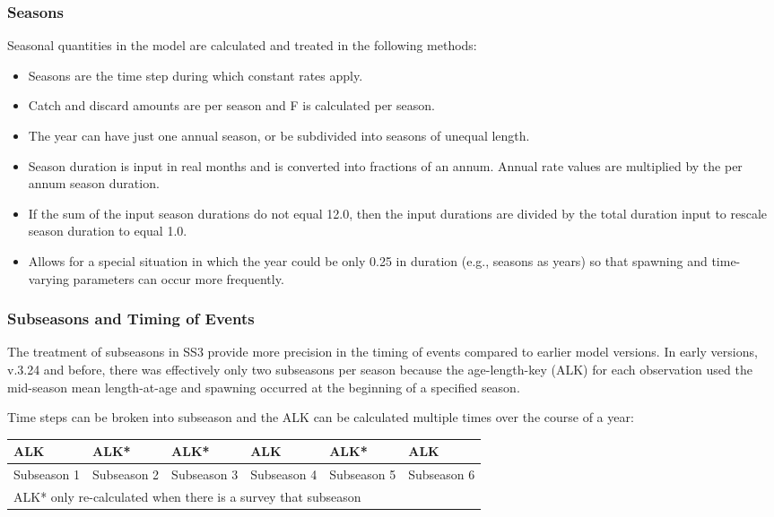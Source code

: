 \subsubsection{Seasons}
Seasonal quantities in the model are calculated and treated in the following methods:
	 \begin{itemize}
	 	\item Seasons are the time step during which constant rates apply.
	 	\item Catch and discard amounts are per season and F is calculated per season.
	 	\item The year can have just one annual season, or be subdivided into seasons of unequal length.
	 	\item Season duration is input in real months and is converted into fractions of an annum.  Annual rate values are multiplied by the per annum season duration.
	 	\item If the sum of the input season durations do not equal 12.0, then the input durations are divided by the total duration input to rescale season duration to equal 1.0.  
	 	\item Allows for a special situation in which the year could be only 0.25 in duration (e.g., seasons as years) so that spawning and time-varying parameters can occur more frequently.	 	
	 \end{itemize}

\subsubsection{Subseasons and Timing of Events}
\hypertarget{SubSeas}{}
The treatment of subseasons in SS3 provide more precision in the timing of events compared to earlier model versions. In early versions, v.3.24 and before, there was effectively only two subseasons per season because the age-length-key (ALK) for each observation used the mid-season mean length-at-age and spawning occurred at the beginning of a specified season.  

Time steps can be broken into subseason and the ALK can be calculated multiple times over the course of a year:

\begin{center}
	\begin{tabular}{| p{2.37cm}| p{2.37cm}|  p{2.37cm}|  p{2.37cm}|  p{2.37cm}|  p{2.37cm}|  }
		\hline
		ALK & ALK* & ALK* & ALK & ALK* & ALK \Tstrut\Bstrut\\
		\hline
		Subseason 1 & Subseason 2 & Subseason 3 & Subseason 4 & Subseason 5 & Subseason 6 \Tstrut\Bstrut\\		
		\hline
		\multicolumn{6}{l}{ALK* only re-calculated when there is a survey that subseason }\Tstrut\Bstrut\\		
	\end{tabular}
\end{center}

